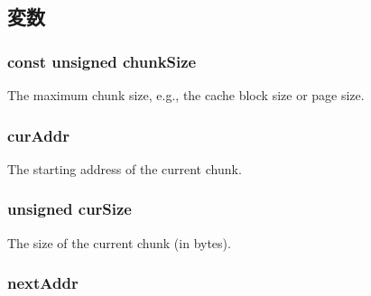 \subsection{変数}
\hypertarget{classChunkGenerator_ac263b0783f6a47755de4c13fcd212c87}{
\subsubsection[{chunkSize}]{\setlength{\rightskip}{0pt plus 5cm}const unsigned {\bf chunkSize}}}
\label{classChunkGenerator_ac263b0783f6a47755de4c13fcd212c87}
The maximum chunk size, e.g., the cache block size or page size. \hypertarget{classChunkGenerator_a791de8c75b67169bea9c7e9b56a294f7}{
\subsubsection[{curAddr}]{ {\bf curAddr}}}
\label{classChunkGenerator_a791de8c75b67169bea9c7e9b56a294f7}
The starting address of the current chunk. \hypertarget{classChunkGenerator_a33d0ca999186c72380a50c5e4b6e9880}{
\subsubsection[{curSize}]{\setlength{\rightskip}{0pt plus 5cm}unsigned {\bf curSize}}}
\label{classChunkGenerator_a33d0ca999186c72380a50c5e4b6e9880}
The size of the current chunk (in bytes). \hypertarget{classChunkGenerator_a76968ef2ad8d208fe33cfb493986e85a}{
\subsubsection[{nextAddr}]{ {\bf nextAddr}}}
